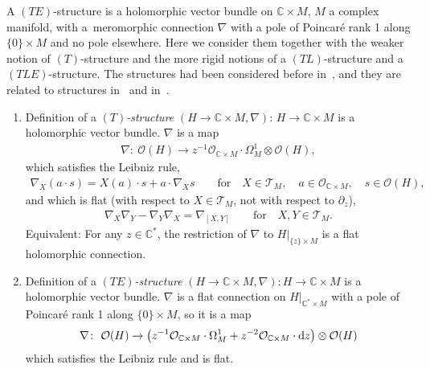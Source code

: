 \documentclass[pdftex]{sigma}%
\numberwithin{equation}{section}
\numberwithin{figure}{section}
\newcommand{\C}{{\mathbb C}}
\newcommand{\OO}{{\mathcal O}}
\newcommand{\TT}{{\mathcal T}}
\newcommand{\paa}{\partial}
\newcommand{\nnn}{\nabla}
\begin{document}
A $(TE)$-structure is a holomorphic vector bundle
on $\C\times M$, $M$ a complex manifold, with a~meromorphic connection $\nnn$ with a pole of
Poincar\'e rank 1 along $\{0\}\times M$ and no pole elsewhere.
Here we consider them together with the weaker notion
of $(T)$-structure and the more rigid notions
of a $(TL)$-structure and a $(TLE)$-structure.
The structures had been considered before in~\cite{HM04},
and they are related to structures in~\cite[Chapter~VII]{Sa02}
and in~\cite{Sa05}.

\begin{Definition}\label{t3.1}\qquad
\begin{enumerate}\itemsep=-2pt
\item[$(a)$] Definition of a {\it $(T)$-structure}
$(H\to\C\times M,\nabla)$:
$H\to\C\times M$ is a holomorphic vector bundle.
$\nabla$ is a map\vspace{-.5ex}
\begin{gather}\label{3.1}
\nabla\colon\ \OO(H)\to z^{-1}\OO_{\C\times M}\cdot \Omega^1_M\otimes \OO(H),
\end{gather}
which satisfies the Leibniz rule,\vspace{-.5ex}
\begin{gather*}
\nnn_X(a\cdot s)= X(a)\cdot s+a\cdot \nnn_X s
\qquad\text{for}\quad X\in\TT_M,\quad a\in\OO_{\C\times M},\quad s\in \OO(H),
\end{gather*}
and which is flat (with respect to $X\in\TT_M$,
not with respect to $\paa_z$),\vspace{-.5ex}
\begin{gather*}
\nnn_X\nnn_Y-\nnn_Y\nnn_X=\nnn_{[X,Y]}
\qquad\text{for}\quad X,Y\in \TT_M.
\end{gather*}
Equivalent: For any $z\in\C^*$, the restriction of $\nabla$ to
$H|_{\{z\}\times M}$ is a flat holomorphic connection.

\item[$(b)$] Definition of a {\it $(TE)$-structure}
$(H\to\C\times M,\nabla)\colon H\to\C\times M$ is a holomorphic vector bundle.
$\nabla$ is a flat connection on $H|_{\C^*\times M}$ with a pole
of Poincar\'e rank 1 along $\{0\}\times M$, so it is a map\vspace{-.5ex}
\begin{gather*}%
\nabla\colon\ \OO(H)\to
\bigl(z^{-1}\OO_{\C\times M}\cdot\Omega^1_M
+z^{-2}\OO_{\C\times M}\cdot{\rm d}z\bigr)\otimes\OO(H)
\end{gather*}
which satisfies the Leibniz rule and is flat.


\end{enumerate}
\end{Definition}
\end{document}
